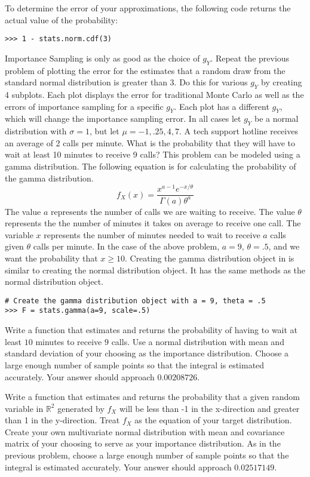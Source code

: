 To determine the error of your approximations, the following code returns the actual value of the probability:
\begin{lstlisting}
>>> 1 - stats.norm.cdf(3)
\end{lstlisting}
 \label{prob:other_plots}
Importance Sampling is only as good as the choice of $g_Y$.
Repeat the previous problem of plotting the error for the estimates that a random draw from the standard normal distribution is greater than 3.
Do this for various $g_Y$ by creating 4 subplots.
Each plot displays the error for traditional Monte Carlo as well as the errors of importance sampling for a specific $g_Y$.
Each plot has a different $g_Y$, which will change the importance sampling error.
In all cases let $g_Y$ be a normal distribution with $\sigma =1$, but let $\mu = -1, .25, 4, 7$.
 \label{prob:gamma}
A tech support hotline receives an average of 2 calls per minute.
What is the probability that they will have to wait at least 10 minutes to receive 9 calls?
This problem can be modeled using a gamma distribution.
The following equation is for calculating the probability of the gamma distribution.
$$f_X(x) = \frac{x^{a-1}e^{-x/\theta}}{\Gamma(a)\theta^a}$$
The value $a$ represents the number of calls we are waiting to receive.
The value $\theta$ represents the the number of minutes it takes on average to receive one call.
The variable $x$ represents the number of minutes needed to wait to receive $a$ calls given $\theta$ calls per minute.
In the case of the above problem, $a = 9$, $\theta = .5$, and we want the probability that $x \geq 10$.
Creating the gamma distribution object in  is similar to creating the normal distribution object.
It has the same methods as the normal distribution object.

\begin{lstlisting}
# Create the gamma distribution object with a = 9, theta = .5
>>> F = stats.gamma(a=9, scale=.5)
\end{lstlisting}

Write a function that estimates and returns the probability of having to wait at least $10$ minutes to receive $9$ calls.
Use a normal distribution with mean and standard deviation of your choosing as the importance distribution.
Choose a large enough number of sample points so that the integral is estimated accurately.
Your answer should approach $0.00208726$.

Write a function that estimates and returns the probability that a given random variable in $\mathbb{R}^2$ generated by $f_X$ will be less than -1 in the x-direction and greater than 1 in the y-direction.
Treat $f_X$ as the equation of your target distribution.
Create your own multivariate normal distribution with mean and covariance matrix of your choosing to serve as your importance distribution.
As in the previous problem, choose a large enough number of sample points so that the integral is estimated accurately.
Your answer should approach $0.02517149$.

